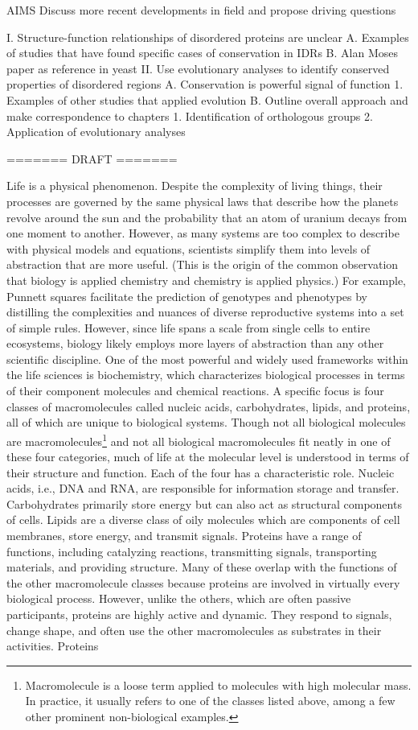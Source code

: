 AIMS
Discuss more recent developments in field and propose driving questions

I. Structure-function relationships of disordered proteins are unclear
    A. Examples of studies that have found specific cases of conservation in IDRs
    B. Alan Moses paper as reference in yeast
II. Use evolutionary analyses to identify conserved properties of disordered regions
    A. Conservation is powerful signal of function
        1. Examples of other studies that applied evolution
    B. Outline overall approach and make correspondence to chapters
        1. Identification of orthologous groups
        2. Application of evolutionary analyses

======= DRAFT =======

Life is a physical phenomenon. Despite the complexity of living things, their processes are governed by the same physical laws that describe how the planets revolve around the sun and the probability that an atom of uranium decays from one moment to another. However, as many systems are too complex to describe with physical models and equations, scientists simplify them into levels of abstraction that are more useful. (This is the origin of the common observation that biology is applied chemistry and chemistry is applied physics.) For example, Punnett squares facilitate the prediction of genotypes and phenotypes by distilling the complexities and nuances of diverse reproductive systems into a set of simple rules. However, since life spans a scale from single cells to entire ecosystems, biology likely employs more layers of abstraction than any other scientific discipline. One of the most powerful and widely used frameworks within the life sciences is biochemistry, which characterizes biological processes in terms of their component molecules and chemical reactions. A specific focus is four classes of macromolecules called nucleic acids, carbohydrates, lipids, and proteins, all of which are unique to biological systems. Though not all biological molecules are macromolecules\footnote{Macromolecule is a loose term applied to molecules with high molecular mass. In practice, it usually refers to one of the classes listed above, among a few other prominent non-biological examples.} and not all biological macromolecules fit neatly in one of these four categories, much of life at the molecular level is understood in terms of their structure and function. Each of the four has a characteristic role. Nucleic acids, i.e., DNA and RNA, are responsible for information storage and transfer. Carbohydrates primarily store energy but can also act as structural components of cells. Lipids are a diverse class of oily molecules which are components of cell membranes, store energy, and transmit signals. Proteins have a range of functions, including catalyzing reactions, transmitting signals, transporting materials, and providing structure. Many of these overlap with the functions of the other macromolecule classes because proteins are involved in virtually every biological process. However, unlike the others, which are often passive participants, proteins are highly active and dynamic. They respond to signals, change shape, and often use the other macromolecules as substrates in their activities. Proteins 